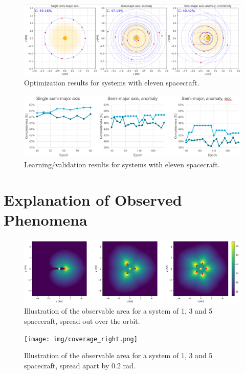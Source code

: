 \begin{figure}[htbp]
 \centering
 \includegraphics[width=1.0\textwidth]{img/orbits_11.png}
 \caption{Optimization results for systems with eleven spacecraft.}
 \label{fig:orbits_11}
\end{figure}
\begin{figure}[htbp]
 \centering
 \includegraphics[width=1.0\textwidth]{img/val_orbits_11.png}
 \caption{Learning/validation results for systems with eleven spacecraft.}
 \label{fig:val_orbits_11}
\end{figure}


\section{Explanation of Observed Phenomena}
\label{sec:results_explanation}

\begin{figure}[htbp]
 \centering
 \includegraphics[width=1.0\textwidth]{img/coverage_spread.png}
 \caption{Illustration of the observable area for a system of 1, 3 and 5 spacecraft, spread out over the orbit.}
 \label{fig:coverage_spread}
\end{figure}

\begin{figure}[htbp]
 \centering
 \texttt{[image: img/coverage\_right.png]}
 \caption{Illustration of the observable area for a system of 1, 3 and 5 spacecraft, spread apart by 0.2 rad.}
 \label{fig:coverage_tight}
\end{figure}

